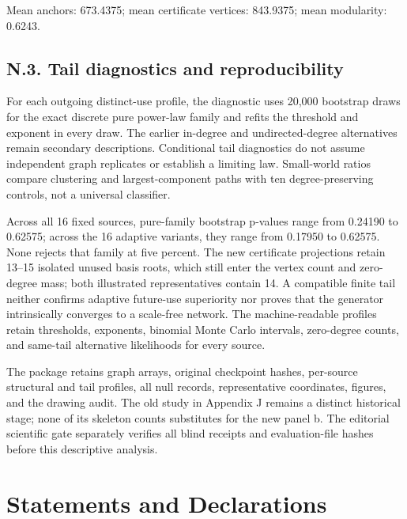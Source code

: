 \documentclass[pdflatex,sn-basic,Numbered]{sn-jnl}
\begin{document}
\endgroup

Mean anchors: 673.4375; mean certificate vertices: 843.9375; mean modularity: 0.6243.

\subsection*{N.3. Tail diagnostics and reproducibility}\label{n.3.-tail-diagnostics-and-reproducibility}

For each outgoing distinct-use profile, the diagnostic uses 20,000 bootstrap draws for the exact discrete pure power-law family and refits the threshold and exponent in every draw. The earlier in-degree and undirected-degree alternatives remain secondary descriptions. Conditional tail diagnostics do not assume independent graph replicates or establish a limiting law. Small-world ratios compare clustering and largest-component paths with ten degree-preserving controls, not a universal classifier.

Across all 16 fixed sources, pure-family bootstrap p-values range from 0.24190 to 0.62575; across the 16 adaptive variants, they range from 0.17950 to 0.62575. None rejects that family at five percent. The new certificate projections retain 13--15 isolated unused basis roots, which still enter the vertex count and zero-degree mass; both illustrated representatives contain 14. A compatible finite tail neither confirms adaptive future-use superiority nor proves that the generator intrinsically converges to a scale-free network. The machine-readable profiles retain thresholds, exponents, binomial Monte Carlo intervals, zero-degree counts, and same-tail alternative likelihoods for every source.

The package  retains graph arrays, original checkpoint hashes, per-source structural and tail profiles, all null records, representative coordinates, figures, and the drawing audit. The old study in Appendix J remains a distinct historical stage; none of its skeleton counts substitutes for the new panel b. The editorial scientific gate separately verifies all blind receipts and evaluation-file hashes before this descriptive analysis.

\clearpage
\section*{Statements and Declarations}
\end{document}
